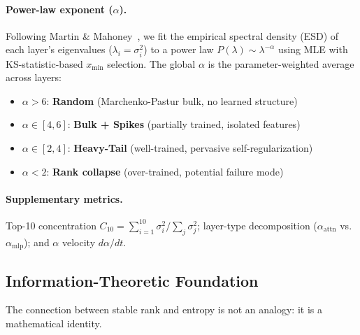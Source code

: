 \paragraph{Power-law exponent ($\alpha$).} Following Martin \& Mahoney~\citep{martin_mahoney_jmlr2021}, we fit the empirical spectral density (ESD) of each layer's eigenvalues ($\lambda_i = \sigma_i^2$) to a power law $P(\lambda) \sim \lambda^{-\alpha}$ using MLE with KS-statistic-based $x_{\min}$ selection. The global $\alpha$ is the parameter-weighted average across layers:
\begin{itemize}[leftmargin=*,itemsep=0pt]
    \item $\alpha > 6$: \textbf{Random} (Marchenko-Pastur bulk, no learned structure)
    \item $\alpha \in [4, 6]$: \textbf{Bulk + Spikes} (partially trained, isolated features)
    \item $\alpha \in [2, 4]$: \textbf{Heavy-Tail} (well-trained, pervasive self-regularization)
    \item $\alpha < 2$: \textbf{Rank collapse} (over-trained, potential failure mode)
\end{itemize}

\paragraph{Supplementary metrics.} Top-10 concentration $C_{10} = \sum_{i=1}^{10}\sigma_i^2 / \sum_j \sigma_j^2$; layer-type decomposition ($\alpha_{\mathrm{attn}}$ vs.\ $\alpha_{\mathrm{mlp}}$); and $\alpha$ velocity $d\alpha/dt$.

\subsection{Information-Theoretic Foundation}
\label{sec:theory}

The connection between stable rank and entropy is not an analogy: it is a mathematical identity.

